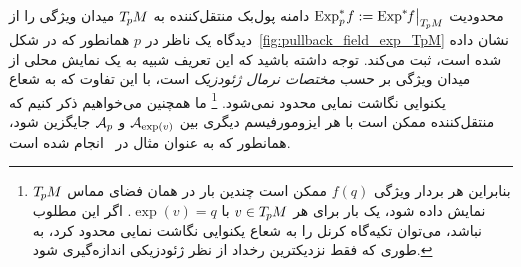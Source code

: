 محدودیت $\operatorname{Exp}^*_p\mkern-2mu f := \operatorname{Exp}^*\mkern-5mu f\big|_{T_{\mkern-1.5mu p}\mkern-.5muM}$ دامنه پول‌بک منتقل‌کننده به $T_{\mkern-1.5mu p}\mkern-.5muM$ میدان ویژگی را از دیدگاه یک ناظر در $p$ همانطور که در شکل~\ref{fig:pullback_field_exp_TpM} نشان داده شده است، ثبت می‌کند.
توجه داشته باشید که این تعریف شبیه به یک نمایش محلی از میدان ویژگی بر حسب \emph{مختصات نرمال ژئودزیک} است، با این تفاوت که به شعاع یکنوایی نگاشت نمایی محدود نمی‌شود.%
\footnote{
    بنابراین هر بردار ویژگی $f(q)$ ممکن است چندین بار در همان فضای مماس $T_{\mkern-1.5mu p}\mkern-.5muM$ نمایش داده شود، یک بار برای هر $v\in T_{\mkern-1.5mu p}\mkern-.5muM$ با $\exp(v)=q$.
    اگر این مطلوب نباشد، می‌توان تکیه‌گاه کرنل را به شعاع یکنوایی نگاشت نمایی محدود کرد، به طوری که فقط نزدیکترین رخداد از نظر ژئودزیکی اندازه‌گیری شود.
}
ما همچنین می‌خواهیم ذکر کنیم که منتقل‌کننده ممکن است با هر ایزومورفیسم دیگری بین $\mathcal{A}_{\exp(v)}$ و $\mathcal{A}_p$ جایگزین شود، همانطور که به عنوان مثال در~\cite{sommer2019horizontal} انجام شده است.


